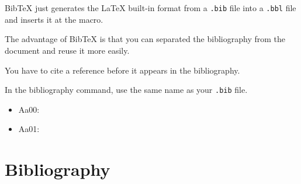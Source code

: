 \documentclass[12pt]{article}
\begin{document}
  BibTeX just generates the LaTeX built-in format from a \lstinline|.bib| file into a \lstinline|.bbl| file and inserts it at the \lstinline|| macro.

  The advantage of BibTeX is that you can separated the bibliography from the document and reuse it more easily.

  You have to cite a reference before it appears in the bibliography.

  In the bibliography command, use the same name as your \lstinline|.bib| file.

  \begin{itemize}
    \item Aa00: \cite{Aa00}
    \item Aa01: \cite{Aa01}
  \end{itemize}

\section{Bibliography}\label{secBib}

  
\end{document}
